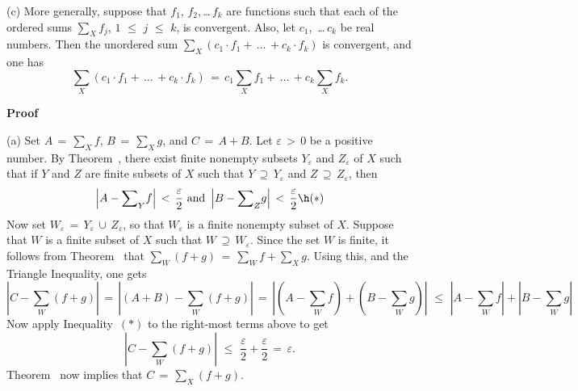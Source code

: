 \V

        (c) More generally, suppose that $f_{1}$, $f_{2}$,\,{\ldots}\,$f_{k}$ are functions such that each of the ordered sums ${\sum}_{X} f_{j}$, $1\,\,{\leq}\,\,j\,\,{\leq}\,\,k$, is convergent.
    Also, let $c_{1}$, \,{\ldots}\,$c_{k}$ be real numbers. Then the unordered sum
    ${\sum}_{X} (c_{1}{\cdot}f_{1} + \,{\ldots}\,+ c_{k}{\cdot}f_{k})$ is convergent, and one has
        \begin{displaymath}
        {\sum}_{X} (c_{1}{\cdot}f_{1} + \,{\ldots}\,+ c_{k}{\cdot}f_{k}) \,=\, 
    c_{1}{\sum}_{X} f_{1} + \,{\ldots}\,+ c_{k}{\sum}_{X} f_{k}.
        \end{displaymath}

\V

        {\bf Proof} 

\V

        (a) Set $A \,=\, {\sum}_{X} f$, $B \,=\, {\sum}_{X} g$, and $C \,=\, A+B$.
    Let ${\varepsilon}\,>\,0$ be a positive number. By Theorem~,
there exist finite nonempty subsets $Y_{{\varepsilon}}$ and $Z_{{\varepsilon}}$ of $X$ such that if $Y$ and $Z$ are finite subsets of $X$ such that $Y \,{\supseteq}\, Y_{{\varepsilon}}$ and $Z \,{\supseteq}\, Z_{{\varepsilon}}$,
    then
        \begin{displaymath}
        \left|A-{\sum}_{Y} f\right|\,<\,\frac{{\varepsilon}}{2} \mbox{ and }
        \left|B-{\sum}_{Z} g\right|\,<\,\frac{{\varepsilon}}{2} \h ({\ast})
        \end{displaymath}
    Now set $W_{{\varepsilon}} \,=\, Y_{{\varepsilon}}\,{\cup}\,Z_{{\varepsilon}}$, so that $W_{{\varepsilon}}$ is a finite nonempty subset of $X$.
    Suppose that $W$ is a finite subset of $X$ such that $W \,{\supseteq}\, W_{{\varepsilon}}$.
    Since the set $W$ is finite, it follows from Theorem~ that ${\sum}_{W} (f+g) \,=\, {\sum}_{W} f + {\sum}_{X} g$.
    Using this, and the Triangle Inequality, one gets
        \begin{displaymath}
        |C-{\sum}_{W} (f+g)| \,=\, |(A+B)-{\sum}_{W} (f+g)| \,=\, 
    \left|\left(A-{\sum}_{W} f\right) + \left(B - {\sum}_{W} g\right)\right|
    \,\,{\leq}\,\,\left|A-{\sum}_{W} f\right| + \left|B - {\sum}_{W} g\right|
        \end{displaymath}
    Now apply Inequality~$({\ast})$ to the right-most terms above to get
        \begin{displaymath}
        |C-{\sum}_{W} (f+g)|\,\,{\leq}\,\, \frac{{\varepsilon}}{2} + \frac{{\varepsilon}}{2} \,=\, {\varepsilon}.
        \end{displaymath}
    Theorem~ now implies that $C \,=\, {\sum}_{X} (f+g)$.


